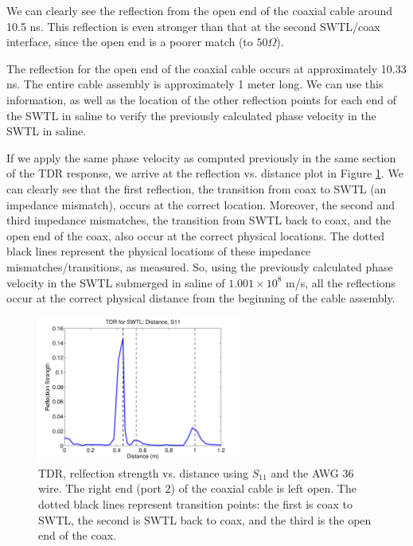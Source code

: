 \documentclass[12pt,onecolumn,titlepage]{article}
\begin{document}
We can clearly see the reflection from the open end of the coaxial cable around 10.5 ns. This reflection is even stronger than that at the second SWTL/coax interface, since the open end is a poorer match (to $50 \Omega$). 

The reflection for the open end of the coaxial cable occurs at approximately 10.33 ns. The entire cable assembly is approximately 1 meter long. We can use this information, as well as the location of the other reflection points for each end of the SWTL in saline to verify the previously calculated phase velocity in the SWTL in saline.

If we apply the same phase velocity as computed previously in the same section of the TDR response, we arrive at the reflection vs. distance plot in Figure \ref{fig:SWTL_TDR_s11_AWG36_vpverify}. We can clearly see that the first reflection, the transition from coax to SWTL (an impedance mismatch), occurs at the correct location. Moreover, the second and third impedance mismatches, the transition from SWTL back to coax, and the open end of the coax, also occur at the correct physical locations. The dotted black lines represent the physical locations of these impedance mismatches/transitions, as measured. So, using the previously calculated phase velocity in the SWTL submerged in saline of $1.001 \times 10^8$ m/s, all the reflections occur at the correct physical distance from the beginning of the cable assembly. 




\begin{figure}[htbp]
	\centering
	\includegraphics[width=0.6\textwidth]{Pictures/22July2013/SWTL_TDR_s11_AWG36_vpverify}
	\caption{ TDR, relfection strength vs. distance using $S_{11}$ and the AWG 36 wire. The right end (port 2) of the coaxial cable is left open. The dotted black lines represent transition points: the first is coax to SWTL, the second is SWTL back to coax, and the third is the open end of the coax. } 
	\label{fig:SWTL_TDR_s11_AWG36_vpverify}
\end{figure}
\end{document}
